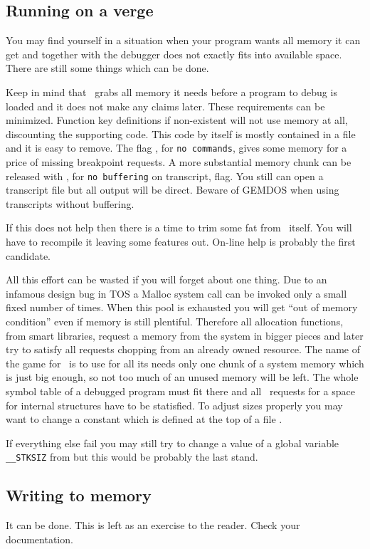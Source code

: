 \subsection{Running on a verge}

You may find yourself in a situation when your program wants all
memory it can get and together with the debugger does not exactly
fits into available space.
There are still some things which can be done.

Keep in mind that \szadb\ grabs all memory it needs before a program
to debug is loaded and it does not make any claims later.
These requirements can be minimized. 
Function key definitions if non-existent will not use memory at all,
discounting the supporting code.  
This code by itself is mostly contained in a file 
and it is easy to remove.
The flag , for {\tt no commands},  gives some memory for a price
of missing breakpoint requests.
A more substantial memory chunk can be released with 
, for {\tt no buffering} on transcript, flag.
You still can open a transcript file but all output will be direct.
Beware of GEMDOS when using transcripts without buffering.

If this does not help then there is a time to trim some fat from
\szadb\ itself. You will have to recompile it leaving some features
out.  On-line help is probably the first candidate.

All this effort can be wasted if you will forget about one thing.
Due to an infamous design bug in TOS a Malloc system call can
be invoked only a small fixed number of times. When this pool is
exhausted you will get ``out of memory condition'' even if memory
is still plentiful.
Therefore all allocation functions, from smart libraries,
request a memory from the system in bigger pieces and later
try to satisfy all requests chopping from an already owned resource.
The name of the game for \szadb\ is to use for all its needs
only one chunk of a system memory which is just big enough, so
not too much of an unused memory will be left.
The whole symbol table of a de\-bug\-ged program must fit there and
all \szadb\ requests for a space for in\-ter\-nal structures have to
be statisfied.
To adjust sizes properly
you may want to change a constant  which is defined
at the top of a file .

If everything else fail you may still try to change a value of
a global variable \verb|__STKSIZ| from  but this
would be probably the last stand.

\subsection{Writing to memory}

It can be done.
This is left as an exercise to the reader.
Check your documentation.
